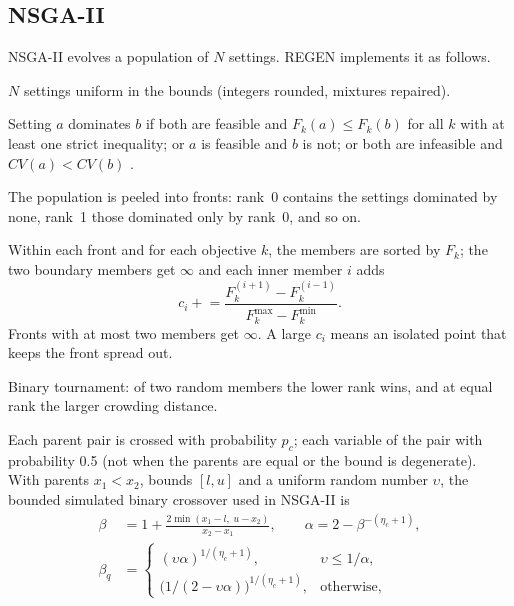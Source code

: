 \subsection{NSGA-II}
NSGA-II \citep{deb2002} evolves a population of $N$ settings. REGEN implements it as follows.
\begin{description}[style=nextline]
  \item[Initialization] $N$ settings uniform in the bounds (integers rounded, mixtures repaired).
  \item[Constraint domination] Setting $a$ dominates $b$ if both are feasible and $F_k(a)\le F_k(b)$ for all $k$
        with at least one strict inequality; or $a$ is feasible and $b$ is not; or both are infeasible and
        $CV(a)<CV(b)$ \citep{deb2002}.
  \item[Non-dominated sorting] The population is peeled into fronts: rank~0 contains the settings dominated by
        none, rank~1 those dominated only by rank~0, and so on.
  \item[Crowding distance] Within each front and for each objective $k$, the members are sorted by $F_k$; the two
        boundary members get $\infty$ and each inner member $i$ adds
        \begin{equation}
        c_i\mathrel{+}=\frac{F_{k}^{(i+1)}-F_{k}^{(i-1)}}{F_{k}^{\max}-F_{k}^{\min}}.
        \label{eq:ch08-crowding}
        \end{equation}
        Fronts with at most two members get $\infty$. A large $c_i$ means an isolated point that keeps the front
        spread out.
  \item[Parent selection] Binary tournament: of two random members the lower rank wins, and at equal rank the
        larger crowding distance.
  \item[Crossover (SBX)] Each parent pair is crossed with probability $p_c$; each variable of the pair with
        probability 0.5 (not when the parents are equal or the bound is degenerate). With parents $x_1<x_2$, bounds
        $[l,u]$ and a uniform random number $\upsilon$, the bounded simulated binary crossover used in NSGA-II is
        \begin{align}
        \beta&=1+\frac{2\min(x_1-l,\;u-x_2)}{x_2-x_1},\qquad \alpha=2-\beta^{-(\eta_c+1)},\nonumber\\
        \beta_q&=\begin{cases}(\upsilon\alpha)^{1/(\eta_c+1)}, & \upsilon\le 1/\alpha,\\
        \bigl(1/(2-\upsilon\alpha)\bigr)^{1/(\eta_c+1)}, & \text{otherwise,}\end{cases}\label{eq:ch08-sbx}\\

\end{align}
\end{description}
